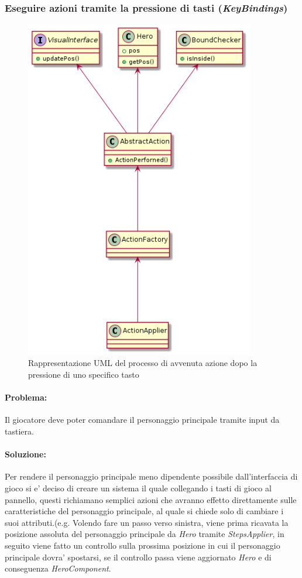 \documentclass[a4paper,12pt]{report}
\begin{document}
\newpage
\subsubsection{Eseguire azioni tramite la pressione di tasti (\emph{KeyBindings})}
\begin{figure}[H]
    \centering{}
    \includegraphics[width=10cm]{img/KeyBindings3.png}
    \caption{Rappresentazione UML del processo di avvenuta azione dopo la pressione di uno specifico tasto}
    \end{figure}

\paragraph{Problema:}Il giocatore deve poter comandare il personaggio principale tramite input da tastiera.

\newpage
\paragraph{Soluzione:}Per rendere il personaggio principale meno dipendente possibile dall'interfaccia di gioco si e' deciso di creare un sistema il quale collegando i tasti di gioco al pannello, questi richiamano semplici azioni che avranno effetto direttamente sulle caratteristiche del personaggio principale, al quale si chiede solo di cambiare i suoi attributi.(e.g. Volendo fare un passo verso sinistra, viene prima ricavata la posizione assoluta del personaggio principale da \emph{Hero} tramite \emph{StepsApplier}, in seguito viene fatto un controllo sulla prossima posizione in cui il personaggio principale dovra' spostarsi, se il controllo passa viene aggiornato \emph{Hero} e di conseguenza \emph{HeroComponent}.
\end{document}
